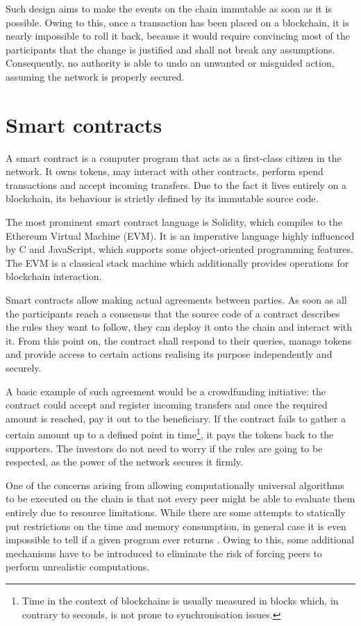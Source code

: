Such design aims to make the events on the chain immutable as soon as it is
possible. Owing to this, once a transaction has been placed on a blockchain, it
is nearly impossible to roll it back, because it would require convincing most
of the participants that the change is justified and shall not break any
assumptions. Consequently, no authority is able to undo an unwanted or misguided
action, assuming the network is properly secured.

\section{Smart contracts}

A smart contract is a computer program that acts as a first-class citizen in the
network. It owns tokens, may interact with other contracts, perform spend
transactions and accept incoming transfers. Due to the fact it lives entirely on
a blockchain, its behaviour is strictly defined by its immutable source code.

The most prominent smart contract language is Solidity, which compiles to the
Ethereum Virtual Machine (EVM). It is an imperative language highly influenced
by C and JavaScript, which supports some object-oriented programming features.
The EVM is a classical stack machine which additionally provides operations for
blockchain interaction.

Smart contracts allow making actual agreements between parties. As soon as all
the participants reach a consensus that the source code of a contract describes
the rules they want to follow, they can deploy it onto the chain and interact
with it. From this point on, the contract shall respond to their queries, manage
tokens and provide access to certain actions realising its purpose independently
and securely.

A basic example of such agreement would be a crowdfunding initiative: the
contract could accept and register incoming transfers and once the required
amount is reached, pay it out to the beneficiary. If the contract fails to
gather a certain amount up to a defined point in time\footnote{Time in the
  context of blockchains is usually measured in blocks which, in contrary to
  seconds, is not prone to synchronisation issues.}, it pays the tokens back to
the supporters. The investors do not need to worry if the rules are going to be
respected, as the power of the network secures it firmly.

One of the concerns arising from allowing computationally universal algorithms
to be executed on the chain is that not every peer might be able to evaluate
them entirely due to resource limitations. While there are some attempts to
statically put restrictions on the time and memory consumption, in general case
it is even impossible to tell if a given program ever returns \cite{turing1937}.
Owing to this, some additional mechanisms have to be introduced to eliminate the
risk of forcing peers to perform unrealistic computations.

